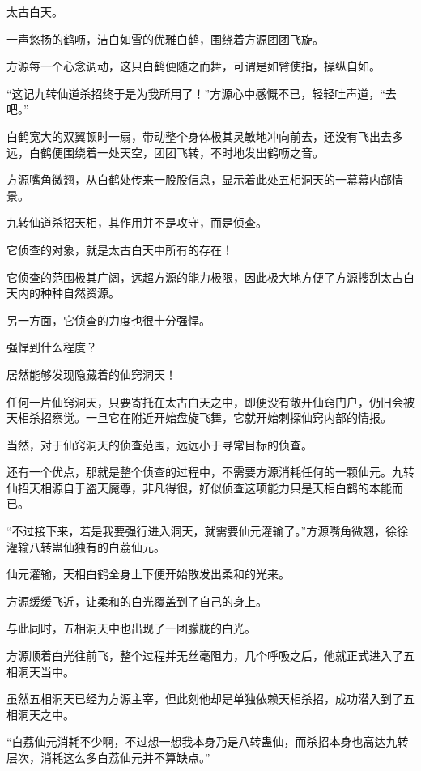 
\begin{this_body}

太古白天。

一声悠扬的鹤呖，洁白如雪的优雅白鹤，围绕着方源团团飞旋。

方源每一个心念调动，这只白鹤便随之而舞，可谓是如臂使指，操纵自如。

“这记九转仙道杀招终于是为我所用了！”方源心中感慨不已，轻轻吐声道，“去吧。”

白鹤宽大的双翼顿时一扇，带动整个身体极其灵敏地冲向前去，还没有飞出去多远，白鹤便围绕着一处天空，团团飞转，不时地发出鹤呖之音。

方源嘴角微翘，从白鹤处传来一股股信息，显示着此处五相洞天的一幕幕内部情景。

九转仙道杀招天相，其作用并不是攻守，而是侦查。

它侦查的对象，就是太古白天中所有的存在！

它侦查的范围极其广阔，远超方源的能力极限，因此极大地方便了方源搜刮太古白天内的种种自然资源。

另一方面，它侦查的力度也很十分强悍。

强悍到什么程度？

居然能够发现隐藏着的仙窍洞天！

任何一片仙窍洞天，只要寄托在太古白天之中，即便没有敞开仙窍门户，仍旧会被天相杀招察觉。一旦它在附近开始盘旋飞舞，它就开始刺探仙窍内部的情报。

当然，对于仙窍洞天的侦查范围，远远小于寻常目标的侦查。

还有一个优点，那就是整个侦查的过程中，不需要方源消耗任何的一颗仙元。九转仙招天相源自于盗天魔尊，非凡得很，好似侦查这项能力只是天相白鹤的本能而已。

“不过接下来，若是我要强行进入洞天，就需要仙元灌输了。”方源嘴角微翘，徐徐灌输八转蛊仙独有的白荔仙元。

仙元灌输，天相白鹤全身上下便开始散发出柔和的光来。

方源缓缓飞近，让柔和的白光覆盖到了自己的身上。

与此同时，五相洞天中也出现了一团朦胧的白光。

方源顺着白光往前飞，整个过程并无丝毫阻力，几个呼吸之后，他就正式进入了五相洞天当中。

虽然五相洞天已经为方源主宰，但此刻他却是单独依赖天相杀招，成功潜入到了五相洞天之中。

“白荔仙元消耗不少啊，不过想一想我本身乃是八转蛊仙，而杀招本身也高达九转层次，消耗这么多白荔仙元并不算缺点。”


\end{this_body}
